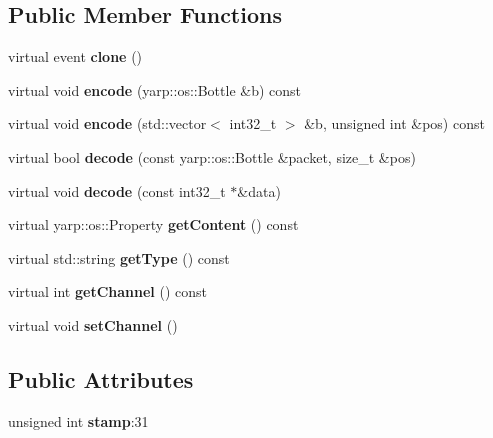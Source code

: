 \subsection*{Public Member Functions}
\begin{DoxyCompactItemize}
\item 
\mbox{\label{classev_1_1vEvent_a44f88f43a5c6b5aa6d93001a11f9309b}} 
virtual event {\bfseries clone} ()
\item 
\mbox{\label{classev_1_1vEvent_a1c817535c284d50449df9a12e085933b}} 
virtual void {\bfseries encode} (yarp\+::os\+::\+Bottle \&b) const
\item 
\mbox{\label{classev_1_1vEvent_a59f6e08e4faa7ae72aa8449a15340f29}} 
virtual void {\bfseries encode} (std\+::vector$<$ int32\+\_\+t $>$ \&b, unsigned int \&pos) const
\item 
\mbox{\label{classev_1_1vEvent_a86e3212efa43423bff4c2bf25434066f}} 
virtual bool {\bfseries decode} (const yarp\+::os\+::\+Bottle \&packet, size\+\_\+t \&pos)
\item 
\mbox{\label{classev_1_1vEvent_a889831584c53a9d14b1a68dfbccf5a6a}} 
virtual void {\bfseries decode} (const int32\+\_\+t $\ast$\&data)
\item 
\mbox{\label{classev_1_1vEvent_a02fb3afb67cf6ff38fa63d1ce8ef12a3}} 
virtual yarp\+::os\+::\+Property {\bfseries get\+Content} () const
\item 
\mbox{\label{classev_1_1vEvent_aeb99e71fbb8e8aa21e911de146768aba}} 
virtual std\+::string {\bfseries get\+Type} () const
\item 
\mbox{\label{classev_1_1vEvent_aa427d1e35f2b762f39820b113377d30c}} 
virtual int {\bfseries get\+Channel} () const
\item 
\mbox{\label{classev_1_1vEvent_a2cf5bf1d01ad2757a82b6e07d7e2a5da}} 
virtual void {\bfseries set\+Channel} ()
\end{DoxyCompactItemize}
\subsection*{Public Attributes}
\begin{DoxyCompactItemize}
\item 
\mbox{\label{classev_1_1vEvent_ad4e003653fa59b37682addefce835490}} 
unsigned int {\bfseries stamp}\+:31
\end{DoxyCompactItemize}
